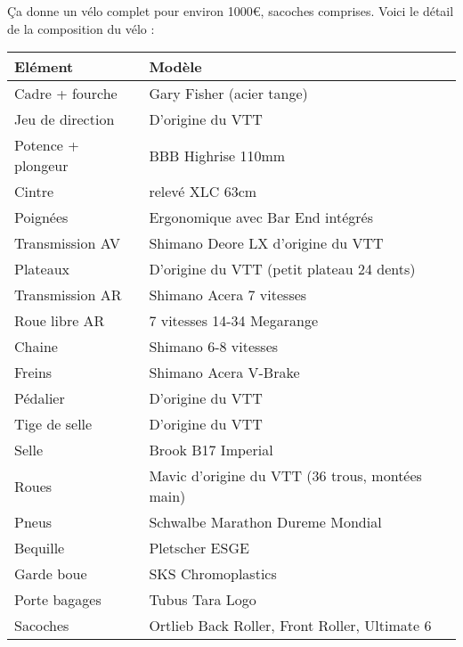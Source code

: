  Ça donne un vélo complet pour environ 1000€, sacoches comprises. Voici le détail de la composition du vélo :
 \begin{center}
  \begin{tabular}{ll}
   \bf  Elément & \bf Modèle    \\ 
   \hline
  Cadre + fourche &  Gary Fisher (acier tange)    \\ 
  Jeu de direction &  D'origine du VTT    \\ 
  Potence + plongeur &  BBB Highrise 110mm    \\ 
  Cintre &  relevé XLC 63cm    \\  
  Poignées &  Ergonomique avec Bar End intégrés    \\   
  Transmission AV &  Shimano Deore LX d'origine du VTT    \\   
  Plateaux &  D'origine du VTT (petit plateau 24 dents)    \\   
  Transmission AR &  Shimano Acera 7 vitesses    \\   
  Roue libre AR &  7 vitesses 14-34 Megarange    \\   
  Chaine &  Shimano 6-8 vitesses    \\   
  Freins &  Shimano Acera V-Brake    \\   
  Pédalier &  D'origine du VTT    \\   
  Tige de selle &  D'origine du VTT    \\   
  Selle &  Brook B17 Imperial    \\   
  Roues &  Mavic d'origine du VTT (36 trous, montées main)    \\   
  Pneus &  Schwalbe Marathon Dureme  Mondial    \\   
  Bequille &  Pletscher ESGE    \\   
  Garde boue &  SKS Chromoplastics    \\   
  Porte bagages &  Tubus Tara  Logo    \\   
  Sacoches &  Ortlieb Back Roller, Front Roller, Ultimate 6 \\
  \hline
   \end{tabular}
   \end{center}
